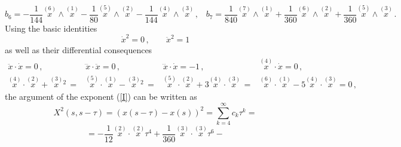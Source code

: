 \documentclass[a4paper,12pt]{article}
\begin{document}
$$
b_6=-\frac 1{144}\stackrel{(6)}{x}\wedge \stackrel{(1)}{x}-\frac
1{80} \stackrel{(5)}{x}\wedge \stackrel{(2)}{x}-\frac
1{144}\stackrel{(4)}{x} \wedge \stackrel{(3)}{x}\,,\;\;\;
b_7=\frac 1{840}\stackrel{(7)}{x}\wedge \stackrel{(1)}{x}+\frac
1{360} \stackrel{(6)}{x}\wedge \stackrel{(2)}{x}+\frac
1{360}\stackrel{(5)}{x} \wedge \stackrel{(3)}{x}\,.
$$
Using the basic identities
$$
\dot x^2=0\,,\;\;\;\;\;\;\; \ddot x^2 =1
$$
as well as their differential consequences
$$
\begin{array}{llll}
\ddot x \cdot \dot x=0\,, & \dddot x\cdot\ddot x=0\,,&\dddot
x\cdot\dot
x=-1\,, & \stackrel{(4)}{x}\cdot \dot x=0\,,\\[5mm]
\stackrel{(4)}{x}\cdot \stackrel{(2)}{x}+\stackrel{(3)}{x}{}^2\,=&
\stackrel{(5)}{x}\cdot
\stackrel{(1)}{x}-\stackrel{(3)}{x}{}^2\,=&\stackrel{(5)}{x}\cdot
\stackrel{(2)}{x}+3\stackrel{(4)}{x}\cdot\stackrel{(3)}{x}\,
=&\stackrel{(6)}{x} \cdot
\stackrel{(1)}{x}-5\stackrel{(4)}{x}\cdot \stackrel{(3)}{x}=0\,,
\end{array}
$$
the argument of the exponent (\ref{I}) can be written as
$$
X^2(s,s-\tau)=(x(s-\tau)-x(s))^2=\sum_{k=4}^\infty  c_k\tau^k=
$$
\begin{equation}\label{X}
=-\frac 1{12}\stackrel{(2)}{x}\cdot \stackrel{(2)}{x}\tau^4+\frac
1{360}\stackrel{(3)}{x}\cdot \stackrel{(3)}{x}\tau^6-
\end{equation}
\end{document}
